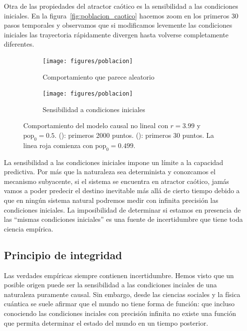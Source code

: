 \documentclass[a4paper,10pt]{book}
\theoremstyle{definition}
\begin{document}

Otra de las propiedades del atractor ca\'otico es la sensibilidad a las condiciones iniciales.
%
En la figura~\ref{fig:poblacion_caotico} hacemos zoom en los primeros 30 pasos temporales y observamos que si modificamos levemente las condiciones iniciales las trayectoria r\'apidamente divergen hasta volverse completamente diferentes.

%

\begin{figure}[ht!]
    \centering
    \begin{subfigure}[b]{0.4\textwidth}
    \centering
    \texttt{[image: figures/poblacion]}
    \caption{Comportamiento que parece aleatorio}
    \label{fig:pseudo_aleatorio}
    \end{subfigure}
    \begin{subfigure}[b]{0.4\textwidth}
    \centering
    \texttt{[image: figures/poblacion]}
    \caption{Sensibilidad a condiciones iniciales}
    \label{fig:sensibilidad}
    \end{subfigure}
    \caption{Comportamiento del modelo causal no lineal con $r=3.99$ y $\text{pop}_0 = 0.5$.
    (): primeros 2000 puntos.
    (): primeros 30 puntos. La linea roja comienza con $\text{pop}_0 = 0.499$.}
    \label{fig:propiedades_caoticas}
\end{figure}

%

La sensibilidad a las condiciones iniciales impone un l\'imite a la capacidad predictiva.
%
Por m\'as que la naturaleza sea determinista y conozcamos el mecanismo subyacente, si el sistema se encuentra en atractor ca\'otico, jam\'as vamos a poder predecir el destino inevitable m\'as all\'a de cierto tiempo debido a que en ningún sistema natural podremos medir con infinita precisi\'on las condiciones iniciales.
%
La imposibilidad de determinar si estamos en presencia de las ``mismas condiciones iniciales'' es una fuente de incertidumbre que tiene toda ciencia emp\'irica.

\subsection{Principio de integridad}\label{sec:principio_integridad}

Las verdades emp\'iricas siempre contienen incertidumbre.
%
Hemos visto que un posible origen puede ser la sensibilidad a las condiciones inciales de una naturaleza puramente causal.
%
Sin embargo, desde las ciencias sociales y la f\'isica cu\'antica se suele afirmar que el mundo no tiene forma de funci\'on: que incluso conociendo las condiciones inciales con precisi\'on infinita no existe una funci\'on que permita determinar el estado del mundo en un tiempo posterior.
\end{document}
